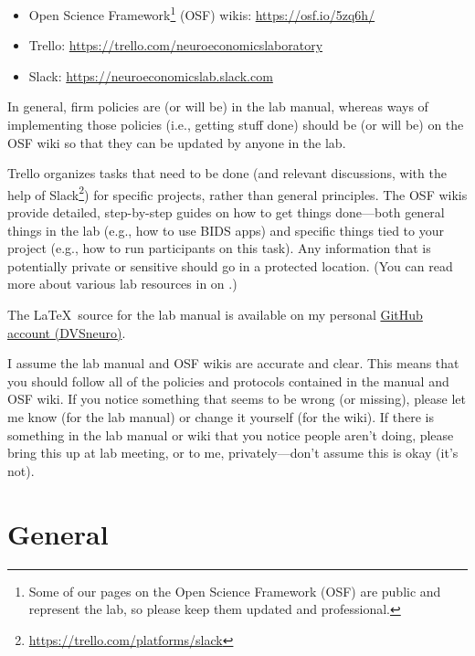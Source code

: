 \documentclass[letterpaper,12pt,oneside]{memoir}
\begin{document}
\begin{itemize}
\item Open Science Framework\footnote{Some of our pages on the Open Science Framework (OSF) are public and represent the lab, so please keep them updated and professional.} (OSF) wikis: \url{https://osf.io/5zq6h/}
\item Trello: \url{https://trello.com/neuroeconomicslaboratory}
\item Slack: \url{https://neuroeconomicslab.slack.com}
\end{itemize}

In general, firm policies are (or will be) in the lab manual, whereas ways of implementing those policies (i.e., getting stuff done) should be (or will be) on the OSF wiki so that they can be updated by anyone in the lab. 

\pagebreak

Trello organizes tasks that need to be done (and relevant discussions, with the help of Slack\footnote{\url{https://trello.com/platforms/slack}}) for specific projects, rather than general principles. The OSF wikis provide detailed, step-by-step guides on how to get things done---both general things in the lab (e.g., how to use BIDS apps) and specific things tied to your project (e.g., how to run participants on this task). Any information that is potentially private or sensitive should go in a protected location. (You can read more about various lab resources in  on .)

The \LaTeX\ source for the lab manual is available on my personal \href{https://github.com/dvsneuro/smithlab_manual}{GitHub account (DVSneuro)}.

\begin{shaded}
\noindent I assume the lab manual and OSF wikis are accurate and clear. This means that you should follow all of the policies and protocols contained in the manual and OSF wiki. If you notice something that seems to be wrong (or missing), please let me know (for the lab manual) or change it yourself (for the wiki). If there is something in the lab manual or wiki that you notice people aren't doing, please bring this up at lab meeting, or to me, privately---don't assume this is okay (it's not).
\end{shaded}


\chapter{General} %
\end{document}
